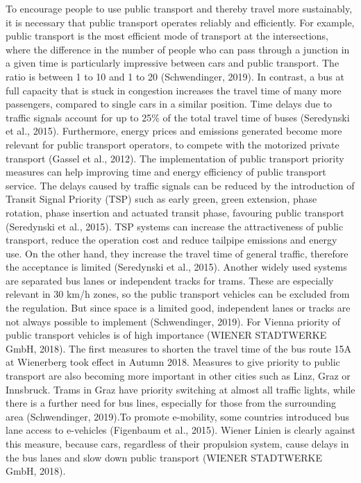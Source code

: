 \documentclass[
]{book}
\begin{document}
To encourage people to use public transport and thereby travel more sustainably, it is necessary that public transport operates reliably and efficiently. For example, public transport is the most efficient mode of transport at the intersections, where the difference in the number of people who can pass through a junction in a given time is particularly impressive between cars and public transport. The ratio is between 1 to 10 and 1 to 20 (Schwendinger, 2019). In contrast, a bus at full capacity that is stuck in congestion increases the travel time of many more passengers, compared to single cars in a similar position. Time delays due to traffic signals account for up to 25\% of the total travel time of buses (Seredynski et al., 2015). Furthermore, energy prices and emissions generated become more relevant for public transport operators, to compete with the motorized private transport (Gassel et al., 2012).
The implementation of public transport priority measures can help improving time and energy efficiency of public transport service. The delays caused by traffic signals can be reduced by the introduction of Transit Signal Priority (TSP) such as early green, green extension, phase rotation, phase insertion and actuated transit phase, favouring public transport (Seredynski et al., 2015). TSP systems can increase the attractiveness of public transport, reduce the operation cost and reduce tailpipe emissions and energy use. On the other hand, they increase the travel time of general traffic, therefore the acceptance is limited (Seredynski et al., 2015). Another widely used systems are separated bus lanes or independent tracks for trams. These are especially relevant in 30 km/h zones, so the public transport vehicles can be excluded from the regulation. But since space is a limited good, independent lanes or tracks are not always possible to implement (Schwendinger, 2019).
For Vienna priority of public transport vehicles is of high importance (WIENER STADTWERKE GmbH, 2018). The first measures to shorten the travel time of the bus route 15A at Wienerberg took effect in Autumn 2018. Measures to give priority to public transport are also becoming more important in other cities such as Linz, Graz or Innsbruck. Trams in Graz have priority switching at almost all traffic lights, while there is a further need for bus lines, especially for those from the surrounding area (Schwendinger, 2019).To promote e-mobility, some countries introduced bus lane access to e-vehicles (Figenbaum et al., 2015). Wiener Linien is clearly against this measure, because cars, regardless of their propulsion system, cause delays in the bus lanes and slow down public transport (WIENER STADTWERKE GmbH, 2018).
\end{document}
